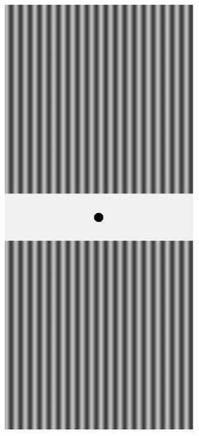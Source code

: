 \begin{figure}[h]
\begin{minipage}[b]{.19\textwidth}
    \end{minipage}
    \begin{minipage}[b]{.19\textwidth}
        \centering
        \includegraphics[keepaspectratio,width=.8\textwidth]{../../Figures/07_21_dg90.pdf}
    \end{minipage}
    \begin{minipage}[b]{.19\textwidth}
        \centering

\end{minipage}
\end{figure}
